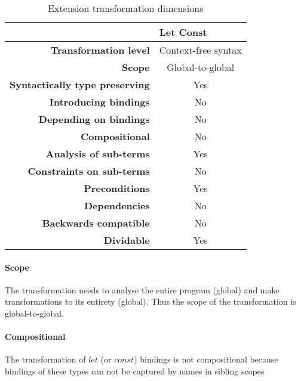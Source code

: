 \documentclass[10pt,a4paper]{article}
\begin{document}
\begin{table}[H]
\centering
\caption{Extension transformation dimensions}
\label{let-const-table}
\begin{tabular}{@{}rc@{}}
\toprule
                                       & \multicolumn{1}{l}{\textbf{Let Const}} \\ \midrule
\textbf{Transformation level}          & Context-free syntax                          \\
\textbf{Scope}                         & Global-to-global                               \\
\textbf{Syntactically type preserving} & Yes                                          \\
\textbf{Introducing bindings}          & No                                          \\%
\textbf{Depending on bindings}         & No                                           \\
\textbf{Compositional}                 & No                                          \\
\textbf{Analysis of sub-terms}          & Yes                                          \\
\textbf{Constraints on sub-terms}       & No                                           \\
\textbf{Preconditions}                 & Yes                                          \\
\textbf{Dependencies}                  & No                                           \\
\textbf{Backwards compatible}          & No                                          \\
\textbf{Dividable}                     & Yes                                           \\ \bottomrule
\end{tabular}
\end{table}

\paragraph{Scope}
The transformation needs to analyse the entire program (global) and make transformations to its entirety (global). Thus the scope of the transformation is global-to-global.

\paragraph{Compositional}
The transformation of $let$ (or $const$) bindings is not compositional because bindings of these types can not be captured by names in sibling scopes
\end{document}
